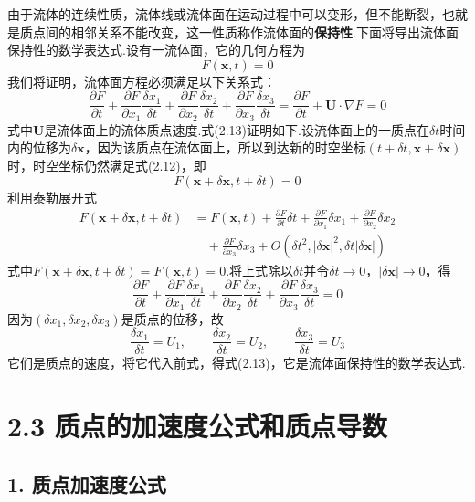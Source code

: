 由于流体的连续性质，流体线或流体面在运动过程中可以变形，但不能断裂，也就是质点间的相邻关系不能改变，这一性质称作流体面的\textbf{保持性}.下面将导出流体面保持性的数学表达式.设有一流体面，它的几何方程为
\begin{equation*}
F(\boldsymbol{x},t)=0
\tag{2.12}
\end{equation*}
我们将证明，流体面方程必须满足以下关系式：
\begin{equation*}
\frac{\partial F}{\partial t}+\frac{\partial F}{\partial x_1}\frac{\delta x_1}{\delta t}+\frac{\partial F}{\partial x_2}\frac{\delta x_2}{\delta t}+\frac{\partial F}{\partial x_3}\frac{\delta x_3}{\delta t}=\frac{\partial F}{\partial t}+\boldsymbol{U}\cdot\nabla F=0
\tag{2.13}
\end{equation*}
式中$\boldsymbol{U}$是流体面上的流体质点速度.式(2.13)证明如下.设流体面上的一质点在$\delta t$时间内的位移为$\delta\boldsymbol{x}$，因为该质点在流体面上，所以到达新的时空坐标$(t+\delta t,\boldsymbol{x}+\delta\boldsymbol{x})$时，时空坐标仍然满足式(2.12)，即
\[
F(\boldsymbol{x}+\delta\boldsymbol{x},t+\delta t)=0
\]
利用泰勒展开式
\begin{align*}
F(\boldsymbol{x}+\delta\boldsymbol{x},t+\delta t)&=F(\boldsymbol{x},t)+\frac{\partial F}{\partial t}\delta t+\frac{\partial F}{\partial x_1}\delta x_1+\frac{\partial F}{\partial x_2}\delta x_2\\
&\quad+\frac{\partial F}{\partial x_3}\delta x_3+O(\delta t^{2},|\delta\boldsymbol{x}|^{2},\delta t|\delta\boldsymbol{x}|)
\end{align*}
式中$F(\boldsymbol{x}+\delta\boldsymbol{x},t+\delta t)=F(\boldsymbol{x},t)=0$.将上式除以$\delta t$并令$\delta t\to 0$，$|\delta\boldsymbol{x}|\to 0$，得
\[
\frac{\partial F}{\partial t}+\frac{\partial F}{\partial x_1}\frac{\delta x_1}{\delta t}+\frac{\partial F}{\partial x_2}\frac{\delta x_2}{\delta t}+\frac{\partial F}{\partial x_3}\frac{\delta x_3}{\delta t}=0
\]
因为$(\delta x_1,\delta x_2,\delta x_3)$是质点的位移，故
\[
\frac{\delta x_1}{\delta t}=U_1,\qquad \frac{\delta x_2}{\delta t}=U_2,\qquad \frac{\delta x_3}{\delta t}=U_3
\]
它们是质点的速度，将它代入前式，得式(2.13)，它是流体面保持性的数学表达式.
\section*{2.3  质点的加速度公式和质点导数}

\subsection*{1. 质点加速度公式}

